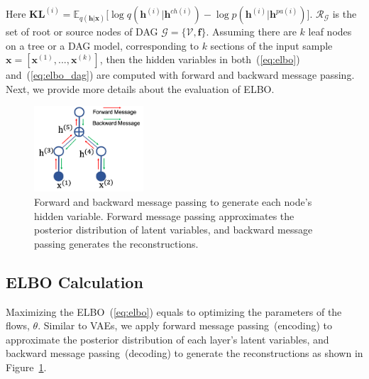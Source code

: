 \documentclass[twoside]{article}
\begin{document}
Here $\mathbf{KL}^{(i)}=\mathbb{E}_{q(\mathbf{h}|\mathbf{x})}\big[  \log q(\mathbf{h}^{(i)}|\mathbf{h}^{ch(i)})   - \log p(\mathbf{h}^{(i)}|\mathbf{h}^{pa(i)}) \big]$.  $\mathcal{R}_{ \mathcal{G}}$ is the set of root or source nodes of DAG $\mathcal{G} = \{\mathcal{V}, \mathbf{f}\}$. Assuming there are $k$ leaf nodes on a tree or a DAG model, corresponding to $k$ sections of the input sample $\mathbf{x} = [\mathbf{x}^{(1)}, ..., \mathbf{x}^{(k)}]$, then the hidden variables in both~(\ref{eq:elbo}) and~(\ref{eq:elbo_dag}) are computed with forward and backward message passing. Next, we provide more details about the evaluation of  ELBO.
\begin{figure}
\vspace{-0.05in}
\begin{center}
 \includegraphics[width=1.6in]{fig/tree_node_message.png}
\end{center}
   \caption{Forward and backward message passing to generate each node's hidden variable. Forward message passing  approximates the posterior distribution of latent variables, and backward message passing generates the reconstructions. }
\label{fig:tree_message}
\vspace{-0.1in}
\end{figure}
\vspace{-0.1in}
\subsection{ELBO Calculation}
Maximizing the ELBO~(\ref{eq:elbo}) equals to  optimizing the parameters of the flows, $\theta$.  Similar to VAEs, we apply forward message passing~(encoding) to approximate the posterior  distribution of each layer's latent variables, and backward message passing~(decoding) to  generate the reconstructions as shown in Figure~\ref{fig:tree_message}. 
\end{document}
